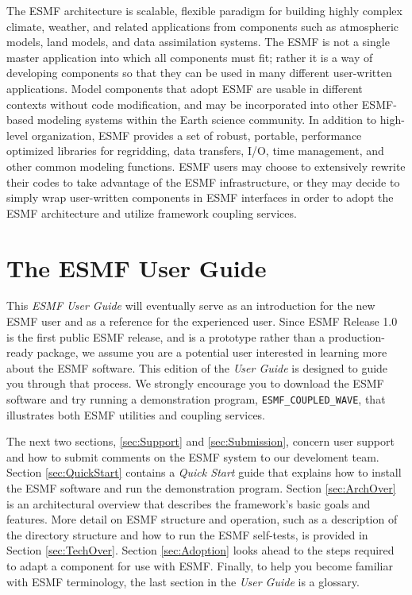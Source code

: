 The ESMF architecture is scalable, flexible paradigm for building highly 
complex climate, weather, and related applications from components such
as atmospheric models, land models, and data assimilation systems.  The 
ESMF is not a single master application into which all components must fit; 
rather it is a way of developing components so that they can be used 
in many different user-written applications.  Model components that adopt 
ESMF are usable in different contexts without code modification, and may be
incorporated into other ESMF-based modeling systems within the Earth 
science community.  In addition to high-level organization, ESMF provides 
a set of robust, portable, performance optimized libraries for regridding, 
data transfers, I/O, time management, and other common modeling functions.  
ESMF users may choose to extensively rewrite their codes to take advantage 
of the ESMF infrastructure, or they may decide to simply wrap user-written 
components in ESMF interfaces in order to adopt the ESMF architecture and 
utilize framework coupling services.

\section{The ESMF User Guide}

This {\it ESMF User Guide} will eventually serve as an introduction for the 
new ESMF user and as a reference for the experienced user.  Since ESMF 
Release 1.0 is the first public ESMF release, and is a prototype rather than 
a production-ready package, we assume you are a potential user interested in 
learning more about the ESMF software.  This edition of the {\it User Guide} 
is designed to guide you through that process.  We strongly encourage you
to download the ESMF software and try running a demonstration program, 
{\tt ESMF\_COUPLED\_WAVE}, that illustrates both ESMF utilities and coupling
services.

The next two sections, \ref{sec:Support} and \ref{sec:Submission}, concern 
user support and how to submit comments on the ESMF system to our develoment 
team.  Section \ref{sec:QuickStart} contains a {\it Quick Start} guide that 
explains how to install the ESMF software and 
run the demonstration program.  Section \ref{sec:ArchOver} is an 
architectural overview that describes the framework's basic goals and features.  
More detail on ESMF structure and operation, such as a description of the 
directory structure and how to run the ESMF self-tests, is provided in Section 
\ref{sec:TechOver}.  Section \ref{sec:Adoption} looks ahead to the steps 
required to adapt a component for use with ESMF.  Finally, to help you become 
familiar with ESMF terminology, the last section in the {\it User Guide} is 
a glossary.  

















